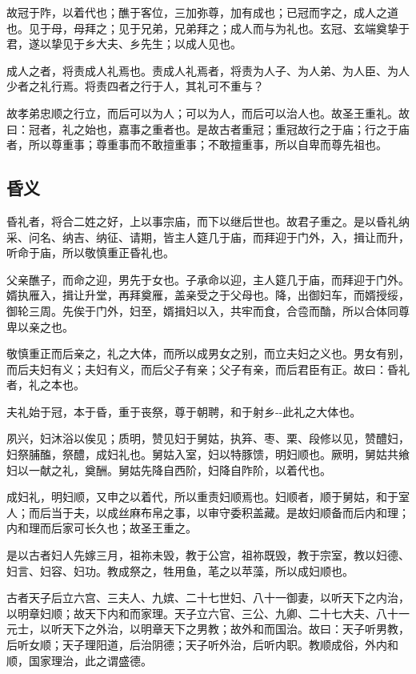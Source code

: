 \documentclass[]{article}
\begin{document}
故冠于阼，以着代也；醮于客位，三加弥尊，加有成也；已冠而字之，成人之道也。见于母，母拜之；见于兄弟，兄弟拜之；成人而与为礼也。玄冠、玄端奠挚于君，遂以挚见于乡大夫、乡先生；以成人见也。

成人之者，将责成人礼焉也。责成人礼焉者，将责为人子、为人弟、为人臣、为人少者之礼行焉。将责四者之行于人，其礼可不重与？

故孝弟忠顺之行立，而后可以为人；可以为人，而后可以治人也。故圣王重礼。故曰：冠者，礼之始也，嘉事之重者也。是故古者重冠；重冠故行之于庙；行之于庙者，所以尊重事；尊重事而不敢擅重事；不敢擅重事，所以自卑而尊先祖也。

\hypertarget{header-n903}{%
\subsection{昏义}\label{header-n903}}

昏礼者，将合二姓之好，上以事宗庙，而下以继后世也。故君子重之。是以昏礼纳采、问名、纳吉、纳征、请期，皆主人筵几于庙，而拜迎于门外，入，揖让而升，听命于庙，所以敬慎重正昏礼也。

父亲醮子，而命之迎，男先于女也。子承命以迎，主人筵几于庙，而拜迎于门外。婿执雁入，揖让升堂，再拜奠雁，盖亲受之于父母也。降，出御妇车，而婿授绥，御轮三周。先俟于门外，妇至，婿揖妇以入，共牢而食，合卺而酳，所以合体同尊卑以亲之也。

敬慎重正而后亲之，礼之大体，而所以成男女之别，而立夫妇之义也。男女有别，而后夫妇有义；夫妇有义，而后父子有亲；父子有亲，而后君臣有正。故曰：昏礼者，礼之本也。

夫礼始于冠，本于昏，重于丧祭，尊于朝聘，和于射乡-\/-此礼之大体也。

夙兴，妇沐浴以俟见；质明，赞见妇于舅姑，执笲、枣、栗、段修以见，赞醴妇，妇祭脯醢，祭醴，成妇礼也。舅姑入室，妇以特豚馈，明妇顺也。厥明，舅姑共飨妇以一献之礼，奠酬。舅姑先降自西阶，妇降自阼阶，以着代也。

成妇礼，明妇顺，又申之以着代，所以重责妇顺焉也。妇顺者，顺于舅姑，和于室人；而后当于夫，以成丝麻布帛之事，以审守委积盖藏。是故妇顺备而后内和理；内和理而后家可长久也；故圣王重之。

是以古者妇人先嫁三月，祖祢未毁，教于公宫，祖祢既毁，教于宗室，教以妇德、妇言、妇容、妇功。教成祭之，牲用鱼，芼之以苹藻，所以成妇顺也。

古者天子后立六宫、三夫人、九嫔、二十七世妇、八十一御妻，以听天下之内治，以明章妇顺；故天下内和而家理。天子立六官、三公、九卿、二十七大夫、八十一元士，以听天下之外治，以明章天下之男教；故外和而国治。故曰：天子听男教，后听女顺；天子理阳道，后治阴德；天子听外治，后听内职。教顺成俗，外内和顺，国家理治，此之谓盛德。
\end{document}
